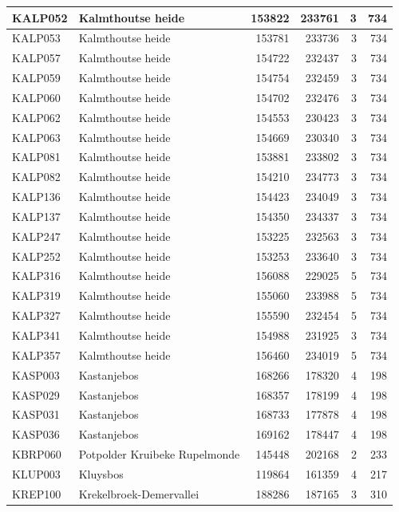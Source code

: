 \documentclass[11pt,]{book}
\begin{document}
\begin{table}
\begin{tabular}[t]{l|l|r|r|r|r}
\hline
KALP052 & Kalmthoutse heide & 153822 & 233761 & 3 & 734\\
\hline
KALP053 & Kalmthoutse heide & 153781 & 233736 & 3 & 734\\
\hline
KALP057 & Kalmthoutse heide & 154722 & 232437 & 3 & 734\\
\hline
KALP059 & Kalmthoutse heide & 154754 & 232459 & 3 & 734\\
\hline
KALP060 & Kalmthoutse heide & 154702 & 232476 & 3 & 734\\
\hline
KALP062 & Kalmthoutse heide & 154553 & 230423 & 3 & 734\\
\hline
KALP063 & Kalmthoutse heide & 154669 & 230340 & 3 & 734\\
\hline
KALP081 & Kalmthoutse heide & 153881 & 233802 & 3 & 734\\
\hline
KALP082 & Kalmthoutse heide & 154210 & 234773 & 3 & 734\\
\hline
KALP136 & Kalmthoutse heide & 154423 & 234049 & 3 & 734\\
\hline
KALP137 & Kalmthoutse heide & 154350 & 234337 & 3 & 734\\
\hline
KALP247 & Kalmthoutse heide & 153225 & 232563 & 3 & 734\\
\hline
KALP252 & Kalmthoutse heide & 153253 & 233640 & 3 & 734\\
\hline
KALP316 & Kalmthoutse heide & 156088 & 229025 & 5 & 734\\
\hline
KALP319 & Kalmthoutse heide & 155060 & 233988 & 5 & 734\\
\hline
KALP327 & Kalmthoutse heide & 155590 & 232454 & 5 & 734\\
\hline
KALP341 & Kalmthoutse heide & 154988 & 231925 & 3 & 734\\
\hline
KALP357 & Kalmthoutse heide & 156460 & 234019 & 5 & 734\\
\hline
KASP003 & Kastanjebos & 168266 & 178320 & 4 & 198\\
\hline
KASP029 & Kastanjebos & 168357 & 178199 & 4 & 198\\
\hline
KASP031 & Kastanjebos & 168733 & 177878 & 4 & 198\\
\hline
KASP036 & Kastanjebos & 169162 & 178447 & 4 & 198\\
\hline
KBRP060 & Potpolder Kruibeke Rupelmonde & 145448 & 202168 & 2 & 233\\
\hline
KLUP003 & Kluysbos & 119864 & 161359 & 4 & 217\\
\hline
KREP100 & Krekelbroek-Demervallei & 188286 & 187165 & 3 & 310\\

\end{tabular}
\end{table}
\end{document}
